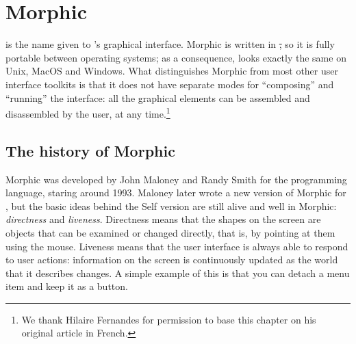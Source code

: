 \documentclass[a4paper,10pt,twoside]{book}
\begin{document}
	\renewcommand{\nnbb}[2]{} %
	\sloppy
\fi
\chapter{Morphic}


 is the name given to \sq's graphical interface.
Morphic is written in \st, so it is fully portable between operating systems; as a consequence, \sq looks exactly the same on Unix, MacOS and Windows.
What distinguishes Morphic from most other user interface toolkits is that it does not have separate modes for ``composing'' and ``running'' the interface: all the graphical elements can be assembled and disassembled by the user, at any time.\footnote{We thank Hilaire Fernandes for permission to base this chapter on his original article in French.}



\section{The history of Morphic}

Morphic was developed by John Maloney and Randy Smith for the  programming language, staring around 1993. 
Maloney later wrote a new version of Morphic for \sq, but the basic ideas behind the Self version are still alive and well in \sq Morphic: \emph{directness} and \emph{liveness}.
Directness means that the shapes on the screen are objects that can be examined or changed directly, that is, by pointing at them using the mouse.
Liveness means that the user interface is always able to respond to user actions: information on the screen is continuously updated as the world that it describes changes.
A simple example of this is that you can detach a menu item and keep it as a button.
\end{document}
